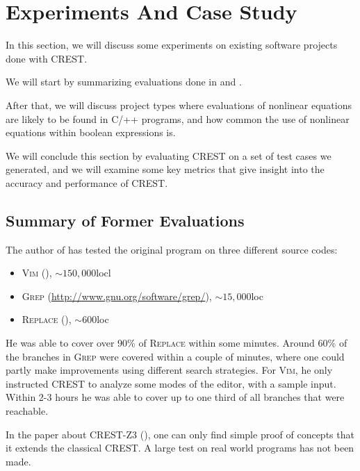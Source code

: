 \documentclass[oribibl]{llncs}
\begin{document}

\section{Experiments And Case Study}
\label{sctn:Experiments}

In this section, we will discuss some experiments on existing software
projects done with
\textsc{CREST}.

We will start by summarizing evaluations done in \cite{CREST} and
\cite{CRESTZ3}.

After that, we will discuss project types where evaluations of
nonlinear equations are likely to be found in \textsc{C/++} programs, and how common the use
of nonlinear equations within boolean expressions is.

We will conclude this section by evaluating CREST on a set of test cases we generated, and we will
examine some key metrics that give insight into the accuracy and performance of CREST.

\subsection{Summary of Former Evaluations}

The author of \cite{CREST} has tested the original program on three
different source codes:

\begin{itemize}
  \item \textsc{Vim} (\cite{oualline2001vi}), $\sim 150,000$locl
  \item \textsc{Grep} (\url{http://www.gnu.org/software/grep/}), $\sim
    15,000$loc
  \item \textsc{Replace} (\cite{harrold2010siemens}), $\sim 600$loc
\end{itemize}

He was able to cover over 90\% of \textsc{Replace} within some
minutes. Around 60\% of the branches in \textsc{Grep} were covered
within a couple of minutes, where one could partly make improvements
using different search strategies. For \textsc{Vim}, he only instructed \textsc{CREST} to analyze some modes of the editor, with a
sample input. Within 2-3 hours he was able to cover up to one third
of all branches that were reachable.

In the paper about \textsc{CREST-Z3} (\cite{CRESTZ3}), one can only
find simple proof of concepts that it extends the classical
\textsc{CREST}. A large test on real world programs has not been made.
\end{document}
